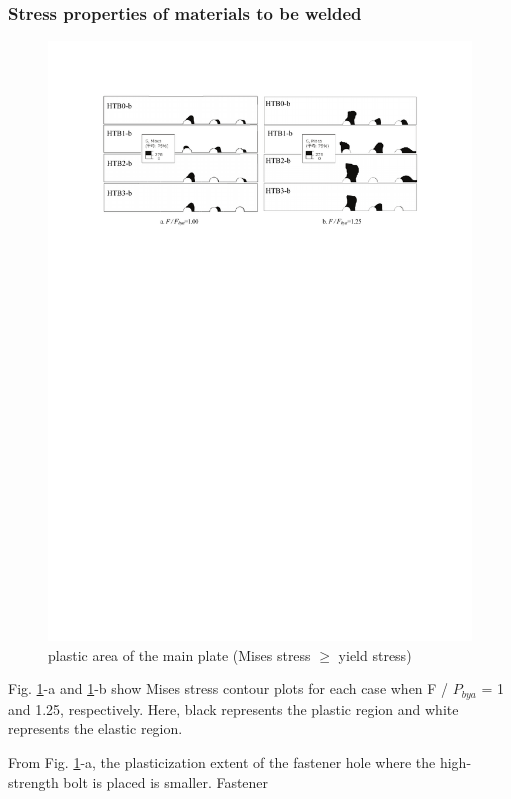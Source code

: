 \subsubsection{Stress properties of materials to be welded}

\begin{figure}[htbp]
    \centering
    \includegraphics[width=\textwidth]{imgs/ch4/fig21.pdf}
    \caption{plastic area of the main plate (Mises stress $\geq$ yield stress)}
    \label{ch4fig21}
\end{figure}

Fig. \ref{ch4fig21}-a and \ref{ch4fig21}-b show Mises stress contour plots for each case when F / $P_{bya}$  = 1 and 1.25, respectively. Here, black represents the plastic region and white represents the elastic region.

From Fig. \ref{ch4fig21}-a, the plasticization extent of the fastener hole where the high-strength bolt is placed is smaller. Fastener

